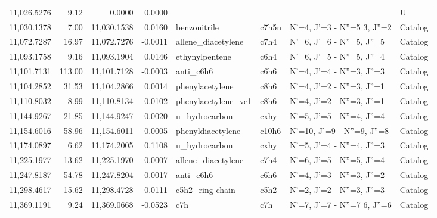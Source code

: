 \begin{longtable}{rrrrllll}
11,026.5276 &      9.12 &            0.0000 &    0.0000 &                             &         &                                      &          U \\
11,030.1378 &      7.00 &       11,030.1538 &    0.0160 &                benzonitrile &   c7h5n &      N'=4, J'=3 - N''=5     3, J''=2 &    Catalog \\
11,072.7287 &     16.97 &       11,072.7276 &   -0.0011 &          allene_diacetylene &    c7h4 &            N'=6, J'=6 - N''=5, J''=5 &    Catalog \\
11,093.1758 &      9.16 &       11,093.1904 &    0.0146 &              ethynylpentene &    c6h4 &            N'=6, J'=5 - N''=5, J''=4 &    Catalog \\
11,101.7131 &    113.00 &       11,101.7128 &   -0.0003 &                   anti_c6h6 &    c6h6 &            N'=4, J'=4 - N''=3, J''=3 &    Catalog \\
11,104.2852 &     31.53 &       11,104.2866 &    0.0014 &             phenylacetylene &    c8h6 &            N'=4, J'=2 - N''=3, J''=1 &    Catalog \\
11,110.8032 &      8.99 &       11,110.8134 &    0.0102 &         phenylacetylene_ve1 &    c8h6 &            N'=4, J'=2 - N''=3, J''=1 &    Catalog \\
11,144.9267 &     21.85 &       11,144.9247 &   -0.0020 &               u_hydrocarbon &    cxhy &            N'=5, J'=5 - N''=4, J''=4 &    Catalog \\
11,154.6016 &     58.96 &       11,154.6011 &   -0.0005 &           phenyldiacetylene &   c10h6 &           N'=10, J'=9 - N''=9, J''=8 &    Catalog \\
11,174.0897 &      6.62 &       11,174.2005 &    0.1108 &               u_hydrocarbon &    cxhy &            N'=5, J'=4 - N''=4, J''=3 &    Catalog \\
11,225.1977 &     13.62 &       11,225.1970 &   -0.0007 &          allene_diacetylene &    c7h4 &            N'=6, J'=5 - N''=5, J''=4 &    Catalog \\
11,247.8187 &     54.78 &       11,247.8204 &    0.0017 &                   anti_c6h6 &    c6h6 &            N'=4, J'=3 - N''=3, J''=2 &    Catalog \\
11,298.4617 &     15.62 &       11,298.4728 &    0.0111 &             c5h2_ring-chain &    c5h2 &            N'=2, J'=2 - N''=3, J''=3 &    Catalog \\
11,369.1191 &      9.24 &       11,369.0668 &   -0.0523 &                         c7h &     c7h &      N'=7, J'=7 - N''=7     6, J''=6 &    Catalog \\

\end{longtable}
